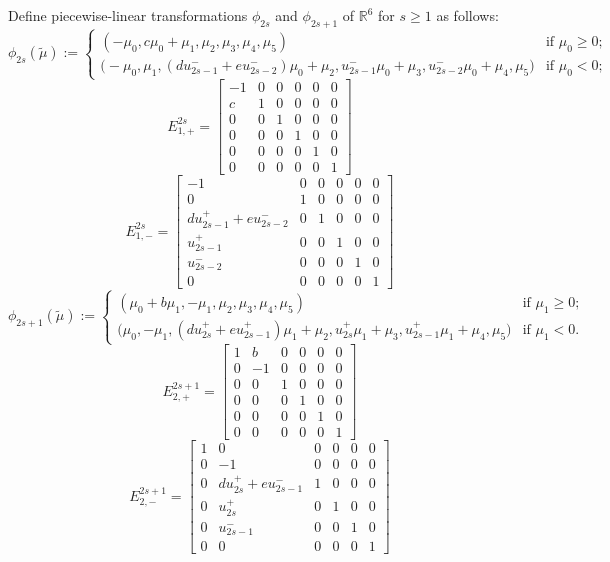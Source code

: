 \documentclass{amsart}
\numberwithin{theorem}{section}
\newcommand{\RR}{\mathbb{R}}
\begin{document}
  Define piecewise-linear transformations $\phi_{2s}$ and $\phi_{2s+1}$ of $\RR^6$ for $s\ge 1$ as follows:
  \begin{equation}
    \phi_{2s}(\tilde\mu)
    :=
    \begin{cases} 
      (-\mu_0,c\mu_0+\mu_1,\mu_2,\mu_3,\mu_4,\mu_5) & \text{if $\mu_0 \ge 0$;}\\
      \big(-\mu_0,\mu_1,(du_{2s-1}^-+eu_{2s-2}^-)\mu_0+\mu_2,u_{2s-1}^-\mu_0+\mu_3,u_{2s-2}^-\mu_0+\mu_4,\mu_5\big) & \text{if $\mu_0 < 0$;}
    \end{cases}
  \end{equation}
  \[E^{2s}_{1,+}=\left[\begin{array}{cccccc} -1 & 0 & 0 & 0 & 0 & 0 \\ c & 1 & 0 & 0 & 0 & 0\\ 0 & 0 & 1 & 0 & 0 & 0\\ 0 & 0 & 0 & 1 & 0 & 0\\ 0 & 0 & 0 & 0 & 1 & 0\\ 0 & 0 & 0 & 0 & 0 &  1\end{array}\right]\]
  \[E^{2s}_{1,-}=\left[\begin{array}{cccccc} -1 & 0 & 0 & 0 & 0 & 0 \\ 0 & 1 & 0 & 0 & 0 & 0\\ du_{2s-1}^+ + eu_{2s-2}^- & 0 & 1 & 0 & 0 & 0\\ u_{2s-1}^+ & 0 & 0 & 1 & 0 & 0\\ u_{2s-2}^- & 0 & 0 & 0 & 1 & 0\\ 0 & 0 & 0 & 0 & 0 &  1\end{array}\right]\]
  \begin{equation}
    \phi_{2s+1}(\tilde\mu)
    :=
    \begin{cases} 
      (\mu_0+b\mu_1,-\mu_1,\mu_2,\mu_3,\mu_4,\mu_5) & \text{if $\mu_1 \ge 0$;}\\
      \big(\mu_0,-\mu_1,(du_{2s}^++eu_{2s-1}^+)\mu_1+\mu_2,u_{2s}^+\mu_1+\mu_3,u_{2s-1}^+\mu_1+\mu_4,\mu_5\big) & \text{if $\mu_1 < 0$.}
    \end{cases}
  \end{equation}
  \[E^{2s+1}_{2,+}=\left[\begin{array}{cccccc} 1 & b & 0 & 0 & 0 & 0 \\ 0 & -1 & 0 & 0 & 0 & 0\\ 0 & 0 & 1 & 0 & 0 & 0\\ 0 & 0 & 0 & 1 & 0 & 0\\ 0 & 0 & 0 & 0 & 1 & 0\\ 0 & 0 & 0 & 0 & 0 &  1\end{array}\right]\]
  \[E^{2s+1}_{2,-}=\left[\begin{array}{cccccc} 1 & 0 & 0 & 0 & 0 & 0 \\ 0 & -1 & 0 & 0 & 0 & 0\\ 0 & du_{2s}^+ + eu_{2s-1}^-  & 1 & 0 & 0 & 0\\ 0 & u_{2s}^+ & 0 & 1 & 0 & 0\\ 0 & u_{2s-1}^- & 0 & 0 & 1 & 0\\ 0 & 0 & 0 & 0 & 0 &  1\end{array}\right]\]
\end{document}
